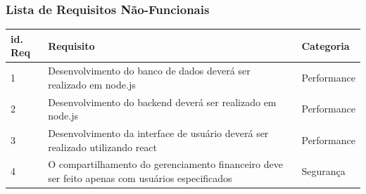 \subsubsection{Lista de Requisitos Não-Funcionais}

\begin{longtable}[h!]{ | M{1.5cm} | T{9cm} | l | } \hline

    \textbf{id. Req} & \textbf{Requisito} &\textbf{Categoria} \\ [5pt] \hline
    
    1 & Desenvolvimento do banco de dados deverá ser realizado em node.js & Performance \\  \hline

    2 & Desenvolvimento do backend deverá ser realizado em node.js & Performance \\  \hline

    3 & Desenvolvimento da interface de usuário deverá ser realizado  utilizando react & Performance \\  \hline

    4 & O compartilhamento do gerenciamento financeiro deve ser feito apenas com usuários especificados & Segurança \\  \hline

\end{longtable}

